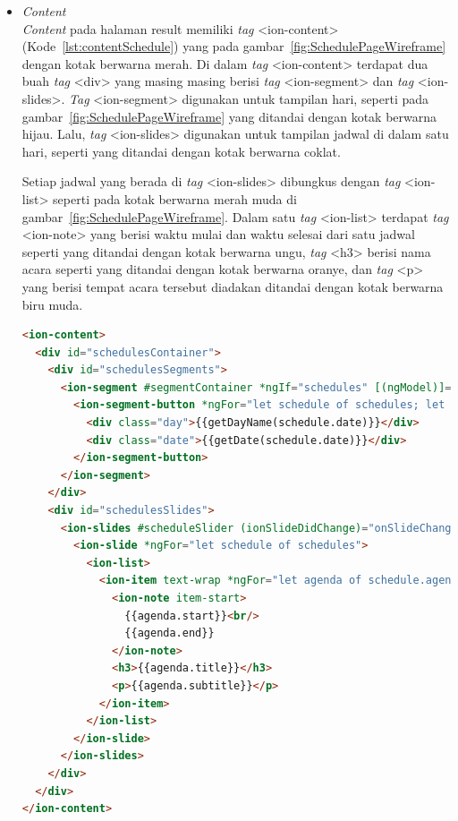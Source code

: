 \begin{itemize}
\begin{itemize}
\begin{lstlisting}[language=html, label={lst:headerSchedule}, caption=\textit{Header} pada schedule.html]
<ion-header>
  <ion-navbar>
    <button ion-button menuToggle>
      <ion-icon name="menu"></ion-icon>
    </button>
    <ion-title>Schedule</ion-title>
  </ion-navbar>
</ion-header>
\end{lstlisting} 
\newpage
		\item \textit{Content} \\
		\textit{Content} pada halaman result memiliki \textit{tag} <ion-content> (Kode~\ref{lst:contentSchedule}) yang pada gambar~\ref{fig:SchedulePageWireframe} dengan kotak berwarna merah. Di dalam \textit{tag} <ion-content> terdapat dua buah \textit{tag} <div> yang masing masing berisi \textit{tag} <ion-segment> dan \textit{tag} <ion-slides>. \textit{Tag} <ion-segment> digunakan untuk tampilan hari, seperti pada gambar~\ref{fig:SchedulePageWireframe} yang ditandai dengan kotak berwarna hijau. Lalu, \textit{tag} <ion-slides> digunakan untuk tampilan jadwal di dalam satu hari, seperti yang ditandai dengan kotak berwarna coklat. 
		
		Setiap jadwal yang berada di \textit{tag} <ion-slides> dibungkus dengan \textit{tag} <ion-list> seperti pada kotak berwarna merah muda di gambar~\ref{fig:SchedulePageWireframe}. Dalam satu \textit{tag} <ion-list> terdapat \textit{tag} <ion-note> yang berisi waktu mulai dan waktu selesai dari satu jadwal seperti yang ditandai dengan kotak berwarna ungu, \textit{tag} <h3> berisi nama acara seperti yang ditandai dengan kotak berwarna oranye, dan \textit{tag} <p> yang berisi tempat acara tersebut diadakan ditandai dengan kotak berwarna biru muda.
		
\begin{lstlisting}[language=html, label={lst:contentSchedule}, caption=\textit{Content} pada schedule.html]
<ion-content>
  <div id="schedulesContainer">
    <div id="schedulesSegments">
      <ion-segment #segmentContainer *ngIf="schedules" [(ngModel)]="selectedSegmentIdx" (ionChange)="onSegmentChanged($event)">
        <ion-segment-button *ngFor="let schedule of schedules; let i = index" [value]="i">
          <div class="day">{{getDayName(schedule.date)}}</div>
          <div class="date">{{getDate(schedule.date)}}</div>
        </ion-segment-button>
      </ion-segment>
    </div>
    <div id="schedulesSlides">
      <ion-slides #scheduleSlider (ionSlideDidChange)="onSlideChanged()">
        <ion-slide *ngFor="let schedule of schedules">
          <ion-list>
            <ion-item text-wrap *ngFor="let agenda of schedule.agenda">
              <ion-note item-start>
                {{agenda.start}}<br/>
                {{agenda.end}}
              </ion-note>
              <h3>{{agenda.title}}</h3>
              <p>{{agenda.subtitle}}</p>
            </ion-item>
          </ion-list>
        </ion-slide>
      </ion-slides>
    </div>
  </div>
</ion-content>
\end{lstlisting} 
		

\end{itemize}
\end{itemize}

